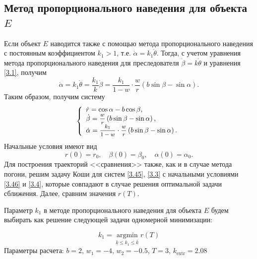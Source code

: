 \documentclass[a4paper,12pt, openany]{book}
\theoremstyle{plain} %
\theoremstyle{definition} %
\theoremstyle{remark} %
\numberwithin{equation}{chapter}
\begin{document}
{\subsection{Метод пропорционального наведения для объекта $E$}

Если объект $E$ наводится также с помощью метода пропорционального наведения \cite{Kim} с постоянным коэффициентом $k_1 > 1$, т.е. $\dot\alpha = k_1 \dot\theta$. Тогда, с учетом уравнения метода пропорционального наведения для преследователя $\dot\beta = k \dot\theta$ и уравнения \eqref{3.1}, получим
\begin{equation}\label{3.44}
\dot \alpha  = k_1 \dot \theta  = \frac{{k_1 }}
{k}\dot \beta  = \frac{{k_1 }}
{{1 - w}} \cdot \frac{w}
{r}\left( {b\sin \beta  - \sin \alpha } \right).
\end{equation}
Таким образом, получим систему 
\begin{equation}\label{3.45}
\left\{ {\begin{array}{*{20}l}
   {\dot r = \cos \alpha  - b\cos \beta ,} \hfill  \\
   {\dot \beta  = \mfrac{w}
{r}\left( {b\sin \beta  - \sin \alpha } \right),} \hfill  \\
   {\dot \alpha  = \mfrac{{k_1 }}
{{1 - w}} \cdot \mfrac{w}
{r}\left( {b\sin \beta  - \sin \alpha } \right).} \hfill  \\
 \end{array} } \right.
\end{equation}
Начальные условия имеют вид
\begin{equation}\label{3.46}
r\left( 0 \right) = r_0, \quad \beta \left( 0 \right) = \beta _0, \quad  \alpha(0) = \alpha_0.
\end{equation}
Для построения траекторий <<сравнения>> также, как и в случае метода погони, решим задачу Коши для систем \eqref{3.45}, \eqref{3.3} с начальными условиями \eqref{3.46} и \eqref{3.4}, которые совпадают в случае решения оптимальной задачи сближения. Далее, сравним значения $r(T)$.

Параметр $k_1$ в методе пропорционального наведения для объекта $E$ будем выбирать как решение следующей задачи одномерной минимизации:

\begin{equation}\label{3.47}
k_1  = \mathop {\mathrm{argmin}}\limits_{\underline k  \leqslant k_1  \leqslant \bar k} {r\left( T \right)}
\end{equation}
Параметры расчета: $b=2$, $w_1 = -4$, $w_2 = -0.5$, $T=3$, $k_{\mathrm{extr}} = 2.08$




}
\end{document}
